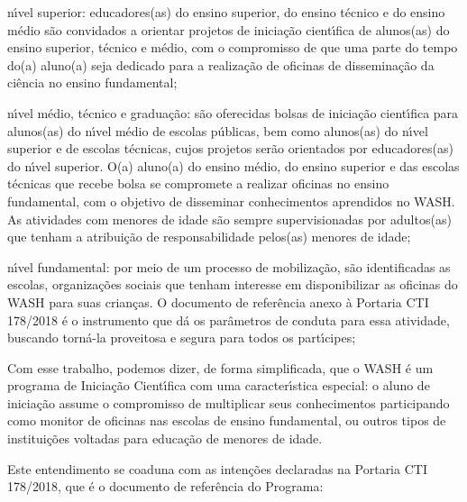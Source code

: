 \documentclass[
12pt,		%
openright,	%
twoside,  %
a4paper,			%
chapter=TITLE,		%
english,			%
french,				%
spanish,			%
brazil				%
]{USPSC-classe/USPSC}
\begin{document}
\begin{alineas}
\item n\'{\i}vel superior: educadores(as) do ensino superior, do ensino t\'ecnico e do ensino m\'edio s\~ao convidados a orientar projetos de inicia\c{c}\~ao cient\'{\i}fica de alunos(as) do ensino superior, t\'ecnico e m\'edio, com o compromisso de que uma parte do tempo do(a) aluno(a) seja dedicado para a realiza\c{c}\~ao de oficinas de dissemina\c{c}\~ao da ci\^encia no ensino fundamental;
\item n\'{\i}vel m\'edio, t\'ecnico e gradua\c{c}\~ao: s\~ao oferecidas bolsas de inicia\c{c}\~ao cient\'{\i}fica para alunos(as) do n\'{\i}vel m\'edio de escolas p\'ublicas, bem como alunos(as) do n\'{\i}vel superior e de escolas t\'ecnicas, cujos projetos ser\~ao orientados por educadores(as) do n\'{\i}vel superior. O(a) aluno(a) do ensino m\'edio, do ensino superior e das escolas t\'ecnicas que recebe bolsa se compromete a realizar oficinas no ensino fundamental, com o objetivo de disseminar conhecimentos aprendidos no WASH. As atividades com menores de idade s\~ao sempre supervisionadas por adultos(as) que tenham a  atribui\c{c}\~ao de responsabilidade pelos(as) menores de idade;
\item n\'{\i}vel fundamental: por meio de um processo de mobiliza\c{c}\~ao, s\~ao identificadas as escolas, organiza\c{c}\~oes sociais que tenham interesse em disponibilizar as oficinas do WASH para suas crian\c{c}as. O documento de refer\^encia anexo \`a Portaria CTI 178/2018 \'e o instrumento que d\'a os par\^ametros de conduta para essa atividade, buscando torn\'a-la proveitosa e segura para todos os part\'{\i}cipes;
\end{alineas}

Com esse trabalho, podemos dizer, de forma simplificada, que o WASH \'e um programa de Inicia\c{c}\~ao Cient\'{\i}fica com uma caracter\'{\i}stica especial: o aluno de inicia\c{c}\~ao assume o compromisso de multiplicar seus conhecimentos participando como monitor de oficinas nas escolas de ensino fundamental, ou outros tipos de institui\c{c}\~oes voltadas para educa\c{c}\~ao de menores de idade.

















Este entendimento se coaduna com as inten\c{c}\~oes declaradas na Portaria CTI 178/2018, que \'e o documento de refer\^encia do Programa:
\end{document}
